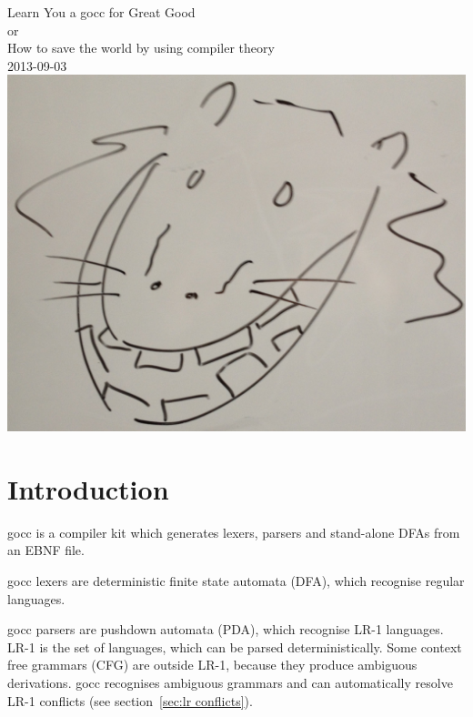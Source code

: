 \documentclass[12pt]{article}
\begin{document}
\begin{center}
	{\Huge Learn You a gocc for Great Good} \\
	{\large or \\
	How to save the world by using compiler theory \\
	\vspace{1cm}
	2013-09-03}\\
	\vspace{1cm}
	\includegraphics[scale=.1]{gocc}
\end{center}
\tableofcontents

\newcommand{\TBD}{\textcolor{red}{TBD}}
\newcommand{\TBDx}[1]{\textcolor{red}{TBD:} #1}
\newcommand{\Go}{{\em Go}\ }
\newcommand{\Code}[1]{{\bf #1} } 
\newcommand{\gocc}{{\em gocc}\ }
\newcommand{\Clang}{{\em C} language}

\section{Introduction}
	gocc is a compiler kit which generates lexers, parsers and stand-alone DFAs from an EBNF file. 

	gocc lexers are deterministic finite state automata (DFA), which recognise regular languages.  

	gocc parsers are pushdown automata (PDA), which recognise LR-1 languages. LR-1 is the set of languages, which can be parsed deterministically. Some context free grammars (CFG) are outside LR-1, because they produce ambiguous derivations. gocc recognises ambiguous grammars and can automatically resolve LR-1 conflicts (see section~\ref{sec:lr conflicts}).
\end{document}
